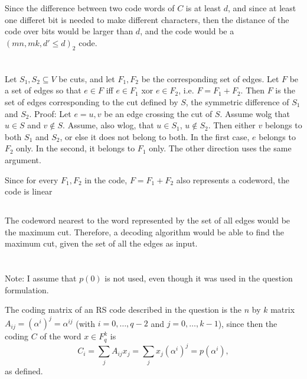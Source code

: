 \documentclass[11pt]{article} \usepackage{amssymb}
\begin{document}
Since the difference between two code words of $C$ is at least $d$, and since
at least one differet bit is needed to make different characters, then
the distance of the code over bits would be larger than $d$, and the code
would be a $(mn,mk,d'\leq d)_2$ code. 

\section{}
\subsection{}
Let $S_1,S_2 \subseteq V$ be cuts, and let $F_1,F_2$ be the corresponding
set of edges. Let $F$ be a set of edges so that $e\in F$ iff 
$e\in F_1$ xor $e\in F_2$, i.e. $F=F_1+F_2$. Then $F$ is the set of edges corresponding
to the cut defined by $S$, the symmetric difference of $S_1$ and $S_2$. Proof:
Let $e={u,v}$ be an edge crossing the cut of $S$. Assume wolg that 
$u\in S$ and $v \not \in S$. Assume, also wlog, that $u\in S_1$, $u \not \in S_2$. Then either $v$ belongs
to both $S_1$ and $S_2$, or else it does not belong to both. In the first
case, $e$ belongs to $F_2$ only. In the second, it belongs to $F_1$ only.
The other direction uses the same argument.

Since for every $F_1,F_2$ in the code, $F=F_1+F_2$ also represents a codeword, 
the code is linear

\subsection{}
The codeword nearest to the word represented by the set of all edges would
be the maximum cut. Therefore, a decoding algorithm would be able to find
the maximum cut, given the set of all the edges as input.

\section{}
Note: I assume that $p(0)$ is not used, even though it was used in the 
question formulation.

The coding matrix of an RS code described in the question is the
$n$ by $k$ matrix $A_{ij}=\left(\alpha^i\right)^j=\alpha^{ij}$ (with $i=0,\ldots,q-2$ and $j=0,\ldots,k-1$), 
since then the coding $C$ of the word $x\in F_q^k$ is
\begin{equation*}
C_i = \sum_jA_{ij}x_j=\sum_jx_j\left(\alpha^i\right)^j=p(\alpha^i),
\end{equation*}
as defined.
  
\end{document}
